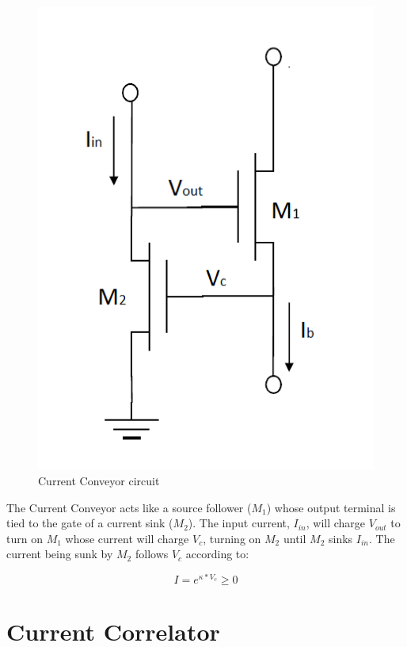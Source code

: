 \begin{figure}[htbp]
  \centering
  \includegraphics[scale=0.5]{pics/Current_Conveyor_circuit.png}
  \caption{Current Conveyor circuit}
  \label{fig:Current_Conveyor_circuit}
\end{figure}
The Current Conveyor acts like a source follower ($M_1$) whose output terminal is tied to the gate of a current sink ($M_2$). The input current, $I_{in}$, will charge $V_{out}$ to turn on $M_1$ whose current will charge $V_c$, turning on $M_2$ until $M_2$ sinks $I_{in}$. The current being sunk by $M_2$ follows $V_c$ according to:

\begin{equation}
I =  e^{\kappa*V_c} \geq 0
\end{equation}  



\section{Current Correlator}

